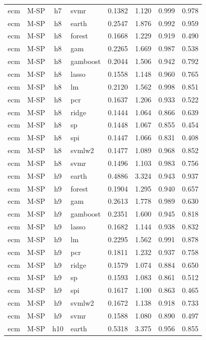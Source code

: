 \begin{ThreePartTable}
\begin{longtable}[t]{llclcccc}
ecm & M-SP & h7 & svmr & 0.1382 & 1.120 & 0.999 & 0.978\\
\addlinespace
ecm & M-SP & h8 & earth & 0.2547 & 1.876 & 0.992 & 0.959\\
ecm & M-SP & h8 & forest & 0.1668 & 1.229 & 0.919 & 0.490\\
ecm & M-SP & h8 & gam & 0.2265 & 1.669 & 0.987 & 0.538\\
ecm & M-SP & h8 & gamboost & 0.2044 & 1.506 & 0.942 & 0.792\\
ecm & M-SP & h8 & lasso & 0.1558 & 1.148 & 0.960 & 0.765\\
ecm & M-SP & h8 & lm & 0.2120 & 1.562 & 0.998 & 0.851\\
ecm & M-SP & h8 & pcr & 0.1637 & 1.206 & 0.933 & 0.522\\
ecm & M-SP & h8 & ridge & 0.1444 & 1.064 & 0.866 & 0.639\\
ecm & M-SP & h8 & sp & 0.1448 & 1.067 & 0.855 & 0.454\\
ecm & M-SP & h8 & spi & 0.1447 & 1.066 & 0.831 & 0.408\\
ecm & M-SP & h8 & svmlw2 & 0.1477 & 1.089 & 0.968 & 0.852\\
ecm & M-SP & h8 & svmr & 0.1496 & 1.103 & 0.983 & 0.756\\
\addlinespace
ecm & M-SP & h9 & earth & 0.4886 & 3.324 & 0.943 & 0.937\\
ecm & M-SP & h9 & forest & 0.1904 & 1.295 & 0.940 & 0.657\\
ecm & M-SP & h9 & gam & 0.2613 & 1.778 & 0.989 & 0.630\\
ecm & M-SP & h9 & gamboost & 0.2351 & 1.600 & 0.945 & 0.818\\
ecm & M-SP & h9 & lasso & 0.1682 & 1.144 & 0.938 & 0.832\\
ecm & M-SP & h9 & lm & 0.2295 & 1.562 & 0.991 & 0.878\\
ecm & M-SP & h9 & pcr & 0.1811 & 1.232 & 0.937 & 0.758\\
ecm & M-SP & h9 & ridge & 0.1579 & 1.074 & 0.884 & 0.650\\
ecm & M-SP & h9 & sp & 0.1593 & 1.083 & 0.861 & 0.512\\
ecm & M-SP & h9 & spi & 0.1617 & 1.100 & 0.863 & 0.465\\
ecm & M-SP & h9 & svmlw2 & 0.1672 & 1.138 & 0.918 & 0.733\\
ecm & M-SP & h9 & svmr & 0.1588 & 1.080 & 0.890 & 0.497\\
\addlinespace
ecm & M-SP & h10 & earth & 0.5318 & 3.375 & 0.956 & 0.855\\

\end{longtable}
\end{ThreePartTable}
